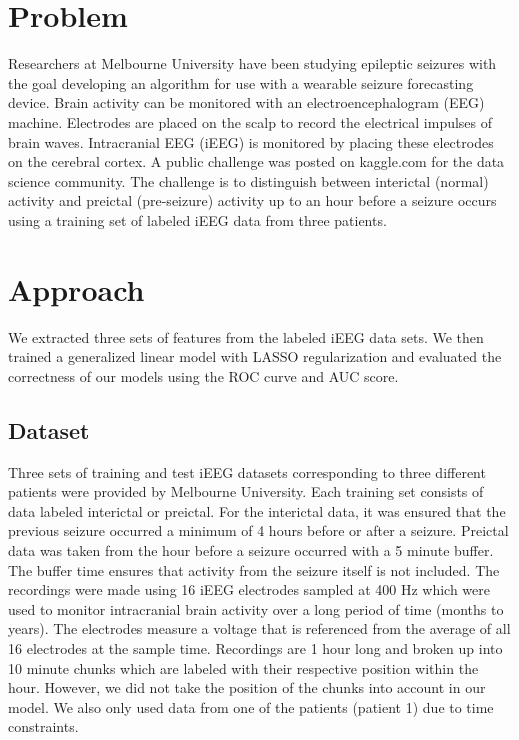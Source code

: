 \documentclass[10pt, conference, compsocconf]{IEEEtran}
\begin{document}
\section{Problem} 
Researchers at Melbourne University have been studying epileptic seizures with
the goal developing an algorithm for use with a wearable seizure forecasting
device. Brain activity can be monitored with an electroencephalogram (EEG)
machine. Electrodes are placed on the scalp to record the electrical impulses of
brain waves. Intracranial EEG (iEEG) is monitored by placing these electrodes on
the cerebral cortex. A public challenge was posted on kaggle.com for the data
science community. The challenge is to distinguish between interictal (normal)
activity and preictal (pre-seizure) activity up to an hour before a seizure
occurs using a training set of labeled iEEG data from three patients.

\section{Approach}
We extracted three sets of features from the labeled iEEG data sets. We then
trained a generalized linear model with LASSO regularization and evaluated the
correctness of our models using the ROC curve and AUC score.

\subsection{Dataset}
Three sets of training and test iEEG datasets corresponding to three different
patients were provided by Melbourne University. Each training set consists of
data labeled interictal or preictal. For the interictal data, it was ensured
that the previous seizure occurred a minimum of 4 hours before or after a
seizure. Preictal data was taken from the hour before a seizure occurred with a
5 minute buffer. The buffer time ensures that activity from the seizure itself
is not included. The recordings were made using 16 iEEG electrodes sampled at
400 Hz which were used to monitor intracranial brain activity over a long period
of time (months to years). The electrodes measure a voltage that is referenced
from the average of all 16 electrodes at the sample time. Recordings are 1 hour
long and broken up into 10 minute chunks which are labeled with their respective
position within the hour. However, we did not take the position of the chunks
into account in our model. We also only used data from one of the patients
(patient 1) due to time constraints.
\end{document}
